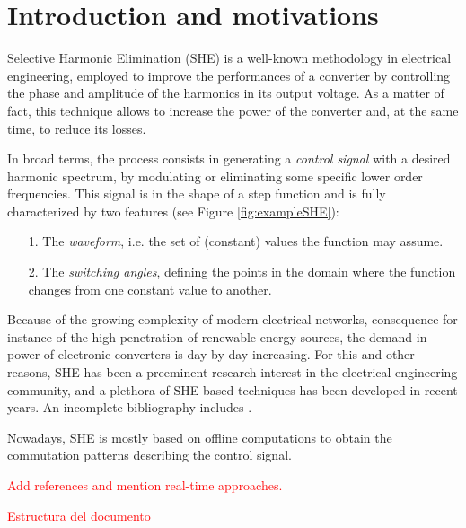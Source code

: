 \section{Introduction and motivations}\label{Section1}

Selective Harmonic Elimination (SHE) \cite{Rodriguez2002} is a well-known methodology in electrical engineering, employed to improve the performances of a converter by controlling the phase and amplitude of the harmonics in its output voltage. As a matter of fact, this technique allows to increase the power of the converter and, at the same time, to reduce its losses. 

In broad terms, the process consists in generating a \textit{control signal} with a desired harmonic spectrum, by modulating or eliminating some specific lower order frequencies. This signal is in the shape of a step function and is fully characterized by two features (see Figure \ref{fig:exampleSHE}): 
\begin{itemize}
	\item[1.] The \textit{waveform}, i.e. the set of (constant) values the function may assume.
	\item[2.] The \textit{switching angles}, defining the points in the domain where the function changes from one constant value to another. 
\end{itemize}



Because of the growing complexity of modern electrical networks, consequence for instance of the high penetration of renewable energy sources, the demand in power of electronic converters is day by day increasing. For this and other reasons, SHE has been a preeminent research interest in the electrical engineering community, and a plethora of SHE-based techniques has been developed in recent years. An incomplete bibliography includes \cite{duranay2017selective,Janabi2020,Yang2017}.

Nowadays, SHE is mostly based on offline computations to obtain the commutation patterns describing the control signal.  

\textcolor{red}{Add references and mention real-time approaches.}

\textcolor{red}{Estructura del documento}


